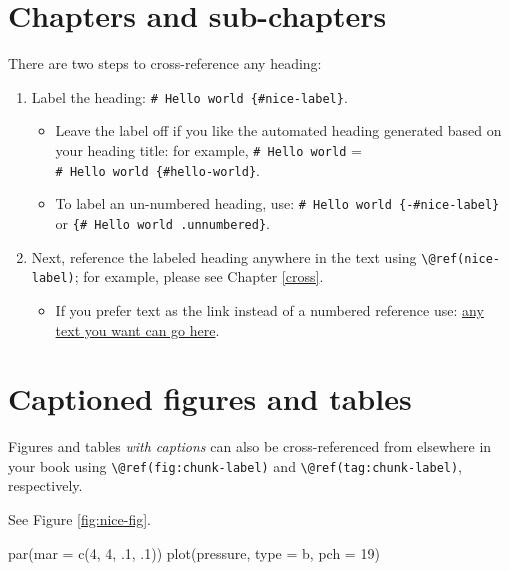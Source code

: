 \documentclass[
]{book}
\newenvironment{Shaded}{\begin{snugshade}}{\end{snugshade}}
\newcommand{\AttributeTok}[1]{\textcolor[rgb]{0.77,0.63,0.00}{#1}}
\newcommand{\DecValTok}[1]{\textcolor[rgb]{0.00,0.00,0.81}{#1}}
\newcommand{\FunctionTok}[1]{\textcolor[rgb]{0.00,0.00,0.00}{#1}}
\newcommand{\NormalTok}[1]{#1}
\newcommand{\StringTok}[1]{\textcolor[rgb]{0.31,0.60,0.02}{#1}}
\providecommand{\tightlist}{%
  \setlength{\itemsep}{0pt}\setlength{\parskip}{0pt}}
\theoremstyle{definition}
\theoremstyle{definition}
\theoremstyle{definition}
\theoremstyle{definition}
\theoremstyle{remark}
\begin{document}
\hypertarget{chapters-and-sub-chapters}{%
\section{Chapters and sub-chapters}\label{chapters-and-sub-chapters}}

There are two steps to cross-reference any heading:

\begin{enumerate}
\def\labelenumi{\arabic{enumi}.}
\tightlist
\item
  Label the heading: \texttt{\#\ Hello\ world\ \{\#nice-label\}}.

  \begin{itemize}
  \tightlist
  \item
    Leave the label off if you like the automated heading generated based on your heading title: for example, \texttt{\#\ Hello\ world} = \texttt{\#\ Hello\ world\ \{\#hello-world\}}.
  \item
    To label an un-numbered heading, use: \texttt{\#\ Hello\ world\ \{-\#nice-label\}} or \texttt{\{\#\ Hello\ world\ .unnumbered\}}.
  \end{itemize}
\item
  Next, reference the labeled heading anywhere in the text using \texttt{\textbackslash{}@ref(nice-label)}; for example, please see Chapter \ref{cross}.

  \begin{itemize}
  \tightlist
  \item
    If you prefer text as the link instead of a numbered reference use: \protect\hyperlink{cross}{any text you want can go here}.
  \end{itemize}
\end{enumerate}

\hypertarget{captioned-figures-and-tables}{%
\section{Captioned figures and tables}\label{captioned-figures-and-tables}}

Figures and tables \emph{with captions} can also be cross-referenced from elsewhere in your book using \texttt{\textbackslash{}@ref(fig:chunk-label)} and \texttt{\textbackslash{}@ref(tag:chunk-label)}, respectively.

See Figure \ref{fig:nice-fig}.

\begin{Shaded}
\begin{Highlighting}[]
\FunctionTok{par}\NormalTok{(}\AttributeTok{mar =} \FunctionTok{c}\NormalTok{(}\DecValTok{4}\NormalTok{, }\DecValTok{4}\NormalTok{, .}\DecValTok{1}\NormalTok{, .}\DecValTok{1}\NormalTok{))}
\FunctionTok{plot}\NormalTok{(pressure, }\AttributeTok{type =} \StringTok{\textquotesingle{}b\textquotesingle{}}\NormalTok{, }\AttributeTok{pch =} \DecValTok{19}\NormalTok{)}
\end{Highlighting}
\end{Shaded}
\end{document}
